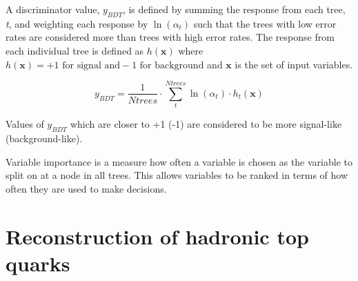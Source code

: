 A discriminator value, $y_{BDT}$, is defined by summing the response from each tree, \emph{t}, and weighting each response by $\ln \left(\alpha_{t}\right)$ such that the trees with low error rates are considered more than trees with high error rates. The response from each individual tree is defined as $h\left(\textbf{x}\right)$ where $h\left(\textbf{x}\right) = +1 \textrm{ for signal and} -1 \textrm{ for background}$ and $\textbf{x}$ is the set of input variables. 

\begin{equation}
y_{BDT} = \frac{1}{Ntrees} \cdot \sum_{t}^{Ntrees} \ln \left(\alpha_{t}\right) \cdot h_{t}\left(\textbf{x}\right)
\end{equation}

Values of $y_{BDT}$ which are closer to +1 (-1) are considered to be more signal-like (background-like).

Variable importance is a measure how often a variable is chosen as the variable to split on at a node in all trees. This allows variables to be ranked in terms of how often they are used to make decisions.

\section{Reconstruction of hadronic top quarks \label{sec:topreco}}

